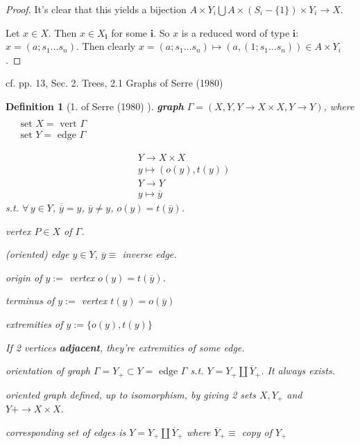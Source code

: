 \documentclass[10pt]{amsart}
\newtheorem{definition}{Definition}
\begin{document}
\begin{multicols*}{2}
\begin{proof}
It's clear that this yields a bijection $A\times Y_i \bigcup A\times (S_i - \lbrace 1 \rbrace) \times Y_i \to X$.  

Let $x\in X$.  Then $x\in X_{\mathbf{i}}$ for some $\mathbf{i}$.  So $x$ is a reduced word of type $\mathbf{i}$: $x = (a;s_1\dots s_n)$.  Then clearly $x = (a;s_1\dots s_n) \mapsto (a,(1;s_1\dots s_n)) \in A\times Y_i$.  







\end{proof}


cf. pp. 13, Sec. 2. Trees, 2.1 Graphs of Serre (1980) \cite{Serr1980}

\begin{definition}[1. of Serre (1980) \cite{Serr1980}]
	\textbf{graph} $\Gamma = (X,Y, Y\to X\times X, Y\to Y)$, where $\begin{aligned} & \quad \\
		& \text{ set } X = \text{ vert } \Gamma \\ 
		& \text{ set } Y = \text{ edge } \Gamma \end{aligned}$  

\[
\begin{aligned}
& Y \to X\times X \\ 
& y\mapsto (o(y), t(y)) \\
& Y\to Y \\
& y\mapsto \overline{y}
\end{aligned}
\]
s.t. $\forall \, y \in Y$, $\overline{ \overline{y}} = y$, $\overline{y} \neq y$, $o(y) = t(\overline{y})$.  

vertex $P \in X$ of $\Gamma$. 

(oriented) edge $y\in Y$, $\overline{y} \equiv $ inverse edge.  

origin of $y := $ vertex $o(y) = t(\overline{y})$.  

terminus of $y:= $ vertex $t(y) = o(\overline{y})$   

extremities of $y:= \lbrace o(y),t(y)\rbrace$  

If 2 vertices \textbf{adjacent}, they're extremities of some edge.  

orientation of graph $\Gamma = Y_+ \subset Y = \text{ edge } \Gamma$ s.t. $Y = Y_+ \coprod \overline{Y}_+$.  It always exists.  

oriented graph defined, up to isomorphism, by giving 2 sets $X,Y_+$ and $Y+ \to X\times X$.  
	
	corresponding set of edges is $Y = Y_+\coprod \overline{Y}_+$ where $\overline{Y}_+ \equiv $ copy of $Y_+$  
\end{definition}


\end{multicols*}
\end{document}
